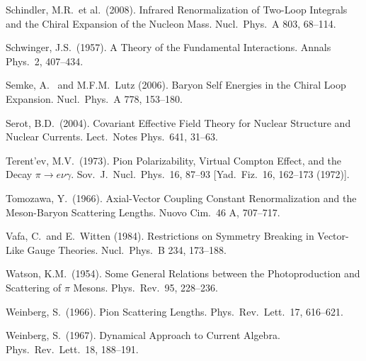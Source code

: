 \documentclass[twoside,12pt]{article}
\begin{document}
\begin{thebibliography}{}
Schindler, M.R.~et al.~(2008).
Infrared Renormalization of Two-Loop Integrals and the Chiral Expansion of
the Nucleon Mass.
Nucl.\ Phys.\  A 803, 68--114.

Schwinger, J.S.~(1957).
A Theory of the Fundamental Interactions.
Annals Phys.\ 2, 407--434.

Semke, A.~ and M.F.M.~Lutz (2006).
Baryon Self Energies in the Chiral Loop Expansion.
Nucl.\ Phys.\  A 778, 153--180.

Serot, B.D.~(2004).
Covariant Effective Field Theory for Nuclear Structure and Nuclear
Currents.
Lect.\ Notes Phys.\  641, 31--63.

Terent'ev, M.V.~(1973).
Pion Polarizability, Virtual Compton Effect, and the Decay $\pi\to e \nu \gamma$.
Sov.\ J.\ Nucl.\ Phys.\  16, 87--93
[Yad.\ Fiz.\  16, 162--173 (1972)].

Tomozawa, Y.~(1966).
Axial-Vector Coupling Constant Renormalization and the Meson-Baryon Scattering Lengths.
Nuovo Cim.\  46 A, 707--717.

Vafa, C.~and E.~Witten (1984).
Restrictions on Symmetry Breaking in Vector-Like Gauge Theories.
Nucl.\ Phys.\  B 234,  173--188.

Watson, K.M.~(1954).
Some General Relations between the Photoproduction and Scattering of $\pi$ Mesons.
Phys.\ Rev.\  95, 228--236.

Weinberg, S.~(1966).
Pion Scattering Lengths.
Phys.\ Rev.\ Lett.\  17, 616--621.

Weinberg, S.~(1967).
Dynamical Approach to Current Algebra.
Phys.\ Rev.\ Lett.\  18, 188--191.


\end{thebibliography}
\end{document}
